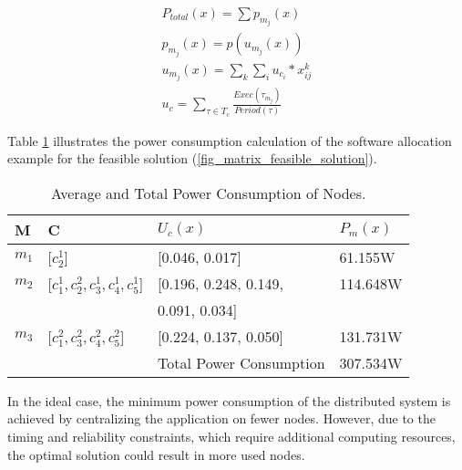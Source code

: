 \begin{align}
\label{eqn_avgpowerconsumption_util}
P_{total}(x) = \sum{p_{m_j}(x)}\\
\label{lbl_power}
p_{m_j}(x) = p(u_{m_j}{(x)})\\
\label{lbl_util}
u_{m_j}{(x)} = \sum_k{\sum_i{u_{c_i}*x^k_{ij}}}\\
\label{eqn_util_component}
u_c = \sum_{\tau\in T_{c}} \frac{Exec(\tau_{m_j})}{Period(\tau)}
\end{align}

Table \ref{tbl_powerconsumption} illustrates the power consumption calculation of the software allocation example for the feasible solution (\ref{fig_matrix_feasible_solution}).

\begin{table}[h]
\linespread{1.0}\small
\centering
\begin{tabular}{@{}llll@{}}
\toprule
M  & C                             					& $U_c (x)$                                    & $P_m (x)$      \\ \midrule
$m_1$ & {[}$c^1_2${]}                     			& {[}0.046, 0.017{]}                       & 61.155W  \\[0.3em]
$m_2$ & {[}$c^1_1, c^2_2, c^1_3, c^1_4, c^1_5${]} 	& {[}0.196, 0.248, 0.149, & 114.648W \\[0.3em]
		& & 0.091, 0.034{]} &\\[0.3em]
$m_3$ & {[}$c^2_1, c^2_3, c^2_4, c^2_5${]}     		& {[}0.224, 0.137, 0.050{]}                & 131.731W \\[0.3em] \bottomrule
& & Total Power Consumption & 307.534W\\
\end{tabular}
\caption{Average and Total Power Consumption of Nodes.}
\label{tbl_powerconsumption}
\end{table}

In the ideal case, the minimum power consumption of the distributed system is achieved by centralizing the application on fewer nodes. However, due to the timing and reliability constraints, which require additional computing resources, the optimal solution could result in more used nodes. 

